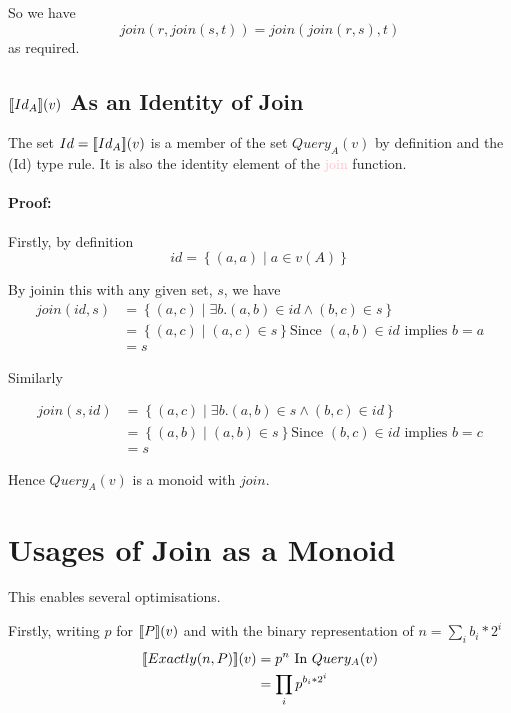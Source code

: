 \documentclass[12pt,a4paper,twoside,openright]{report}
\newcommand\mathName[1]{\textcolor{pink}{#1}}
\newcommand{\db}[1]{{\bf [\![}#1{\bf ]\!]}}
\newcommand{\deno}[1]{\db{#1}(v)}
\newcommand{\setComp}[2]{\left\lbrace #1 \mid #2 \right\rbrace}
\newcommand{\queryT}[1]{Query_{#1}(v)}
\begin{document}
So we have \[ join(r, join(s, t)) = join(join(r, s), t) \] as required.

\subsection{$\deno{Id_A}$ As an Identity of Join}

The set $Id = \deno{Id_A}$ is a member of the set $\queryT{A}$ by definition and the (Id) type rule. It is also the identity element of the \mathName{join} function.

\paragraph{Proof:} Firstly, by definition
\[ id = \setComp{(a, a)}{a \in v(A)}\]

By joinin this with any given set, $s$, we have
\begin{equation}
\label{LeftID}
\begin{split}
join(id, s) & = \setComp{(a, c)}{\exists b. (a, b) \in id \wedge (b, c) \in s}\\
            & = \setComp{(a, c)}{(a, c) \in s} \mbox{Since $(a, b) \in id$ implies $b = a$}\\
            & = s
\end{split}
\end{equation}

Similarly

\begin{equation}
\label{RightID}
\begin{split}
join(s, id) & = \setComp{(a, c)}{\exists b. (a, b) \in s \wedge (b, c) \in id}\\
            & = \setComp{(a, b)}{(a, b) \in s} \mbox{Since $(b, c) \in id$ implies $b = c$}\\
            & = s
\end{split}
\end{equation}



Hence $\queryT{A}$ is a monoid with $join$. 
	
\section{Usages of Join as a Monoid}
\label{exactlyOpt}
This enables several optimisations.

Firstly, writing $p$ for $\deno{P}$ and with the binary representation of $n = \sum_i{b_i * 2^{i}}$
\begin{equation}\label{ExactlyReordering}
\begin{split}
\deno{Exactly(n, P)} & = p^{n} \mbox{ In $\queryT{A}$}\\
					& = \prod_i {p^{b_i * 2^i} }
\end{split}
\end{equation}
\end{document}
